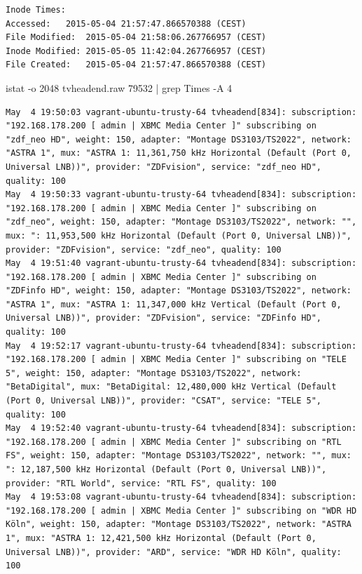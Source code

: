 \begin{cmd}[H]
\begin{verbatim}
Inode Times:
Accessed:	2015-05-04 21:57:47.866570388 (CEST)
File Modified:	2015-05-04 21:58:06.267766957 (CEST)
Inode Modified:	2015-05-05 11:42:04.267766957 (CEST)
File Created:	2015-05-04 21:57:47.866570388 (CEST)
\end{verbatim}
\caption{istat -o 2048 tvheadend.raw 79532 | grep Times -A 4}
\label{cmd:tvheadend-rtlhdaccess}
\end{cmd}

\begin{cmd}[H]
\begin{Verbatim}[fontsize=\tiny]
May  4 19:50:03 vagrant-ubuntu-trusty-64 tvheadend[834]: subscription: "192.168.178.200 [ admin | XBMC Media Center ]" subscribing on "zdf_neo HD", weight: 150, adapter: "Montage DS3103/TS2022", network: "ASTRA 1", mux: "ASTRA 1: 11,361,750 kHz Horizontal (Default (Port 0, Universal LNB))", provider: "ZDFvision", service: "zdf_neo HD", quality: 100
May  4 19:50:33 vagrant-ubuntu-trusty-64 tvheadend[834]: subscription: "192.168.178.200 [ admin | XBMC Media Center ]" subscribing on "zdf_neo", weight: 150, adapter: "Montage DS3103/TS2022", network: "", mux: ": 11,953,500 kHz Horizontal (Default (Port 0, Universal LNB))", provider: "ZDFvision", service: "zdf_neo", quality: 100
May  4 19:51:40 vagrant-ubuntu-trusty-64 tvheadend[834]: subscription: "192.168.178.200 [ admin | XBMC Media Center ]" subscribing on "ZDFinfo HD", weight: 150, adapter: "Montage DS3103/TS2022", network: "ASTRA 1", mux: "ASTRA 1: 11,347,000 kHz Vertical (Default (Port 0, Universal LNB))", provider: "ZDFvision", service: "ZDFinfo HD", quality: 100
May  4 19:52:17 vagrant-ubuntu-trusty-64 tvheadend[834]: subscription: "192.168.178.200 [ admin | XBMC Media Center ]" subscribing on "TELE 5", weight: 150, adapter: "Montage DS3103/TS2022", network: "BetaDigital", mux: "BetaDigital: 12,480,000 kHz Vertical (Default (Port 0, Universal LNB))", provider: "CSAT", service: "TELE 5", quality: 100
May  4 19:52:40 vagrant-ubuntu-trusty-64 tvheadend[834]: subscription: "192.168.178.200 [ admin | XBMC Media Center ]" subscribing on "RTL FS", weight: 150, adapter: "Montage DS3103/TS2022", network: "", mux: ": 12,187,500 kHz Horizontal (Default (Port 0, Universal LNB))", provider: "RTL World", service: "RTL FS", quality: 100
May  4 19:53:08 vagrant-ubuntu-trusty-64 tvheadend[834]: subscription: "192.168.178.200 [ admin | XBMC Media Center ]" subscribing on "WDR HD Köln", weight: 150, adapter: "Montage DS3103/TS2022", network: "ASTRA 1", mux: "ASTRA 1: 12,421,500 kHz Horizontal (Default (Port 0, Universal LNB))", provider: "ARD", service: "WDR HD Köln", quality: 100

\end{Verbatim}
\end{cmd}
